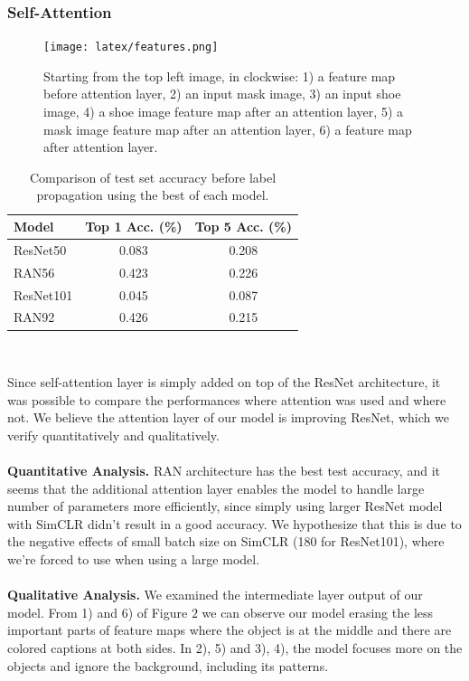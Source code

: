 \documentclass[10pt,twocolumn,letterpaper]{article}
\begin{document}
	\subsubsection{Self-Attention}
	\begin{figure}
		\centering
		\texttt{[image: latex/features.png]}
		\label{fig:features}
		\caption{Starting from the top left image, in clockwise: 1) a feature map before attention layer, 2) an input mask image, 3) an input shoe image, 4) a shoe image feature map after an attention layer, 5) a mask image feature map after an attention layer, 6) a feature map after attention layer.}
	\end{figure}
	\begin{table}
		\centering
		\label{table:RANvsResNet}
		\begin{tabular}{ ||p{1.45cm}|c c||  }
			\hline
			Model & Top 1 Acc. (\%) & Top 5 Acc. (\%)\\
			\hline
			ResNet50&  0.083 & 0.208  \\
			RAN56&  0.423 & 0.226  \\
			ResNet101&  0.045 & 0.087  \\
			RAN92&  0.426 & 0.215  \\
			\hline
		\end{tabular} \\ [1ex]
		\caption{Comparison of test set accuracy before label propagation using the best of each model.}
	\end{table}
	Since self-attention layer is simply added on top of the ResNet architecture, it was possible to compare the performances where attention was used and where not. We believe the attention layer of our model is improving ResNet, which we verify quantitatively and qualitatively.\\\\ \textbf{Quantitative Analysis.} RAN architecture has the best test accuracy, and it seems that the additional attention layer enables the model to handle large number of parameters more efficiently, since simply using larger ResNet model with SimCLR didn't result in a good accuracy. We hypothesize that this is due to the negative effects of small batch size on SimCLR (180 for ResNet101), where we're forced to use when using a large model. \\\\
	\textbf{Qualitative Analysis.} We examined the intermediate layer output of our model. From 1) and 6) of Figure $2$ we can observe our model erasing the less important parts of feature maps where the object is at the middle and there are colored captions at both sides. In 2), 5) and 3), 4), the model focuses more on the objects and ignore the background, including its patterns. 
	
\end{document}
